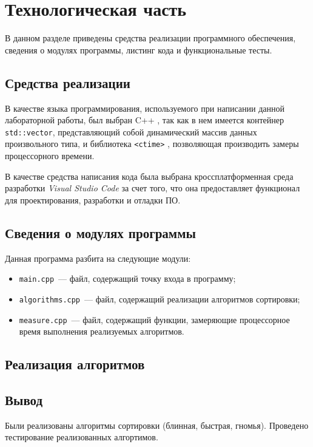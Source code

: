 \chapter{Технологическая часть}

В данном разделе приведены средства реализации программного обеспечения, сведения о модулях программы, листинг кода и функциональные тесты.

\section{Средства реализации}

В качестве языка программирования, используемого при написании данной лабораторной работы, был выбран C++ \cite{cpp-lang}, так как в нем имеется контейнер \texttt{std::vector}, представляющий собой динамический массив данных произвольного типа, и библиотека \texttt{<ctime>} \cite{ctime}, позволяющая производить замеры процессорного времени.

В качестве средства написания кода была выбрана кроссплатформенная среда разработки \textit{Visual Studio Code} за счет того, что она предоставляет функционал для проектирования, разработки и отладки ПО.

\section{Сведения о модулях программы}

Данная программа разбита на следующие модули:

\begin{itemize}
    \item \texttt{main.cpp}~--- файл, содержащий точку входа в программу;
    \item \texttt{algorithms.cpp}~--- файл, содержащий реализации алгоритмов сортировки;
    \item \texttt{measure.cpp}~--- файл, содержащий функции, замеряющие процессорное время выполнения реализуемых алгоритмов.
\end{itemize}

\clearpage
\section{Реализация алгоритмов}

\section*{Вывод}

Были реализованы алгоритмы сортировки (блинная, быстрая, гномья).
Проведено тестирование реализованных алгортимов.
